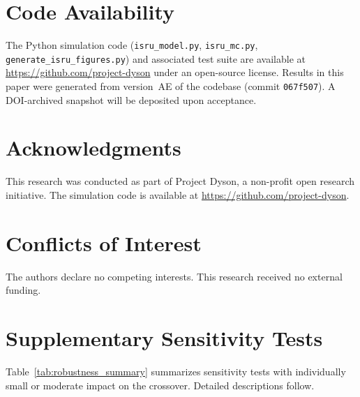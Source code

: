 \documentclass[preprint,12pt]{elsarticle}
\begin{document}
\section*{Code Availability}

The Python simulation code (\texttt{isru\_model.py}, \texttt{isru\_mc.py}, \texttt{generate\_isru\_figures.py}) and associated test suite are available at \url{https://github.com/project-dyson} under an open-source license. Results in this paper were generated from version~AE of the codebase (commit \texttt{067f507}). A DOI-archived snapshot will be deposited upon acceptance.


\section*{Acknowledgments}

This research was conducted as part of Project Dyson, a non-profit open research initiative. The simulation code is available at \url{https://github.com/project-dyson}.

\section*{Conflicts of Interest}

The authors declare no competing interests. This research received no external funding.

\appendix
\section{Supplementary Sensitivity Tests}
\label{sec:appendix_sensitivity}

Table~\ref{tab:robustness_summary} summarizes sensitivity tests with individually small or moderate impact on the crossover. Detailed descriptions follow.
\end{document}
